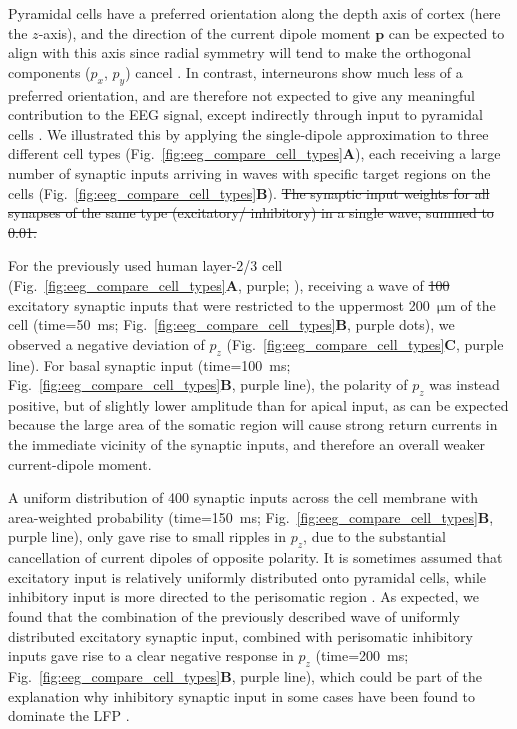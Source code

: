 \documentclass[preprint,10pt,authoryear]{elsarticle}
\newcommand{\hlg}[2][Emerald]{ {\sethlcolor{#1} \hl{#2}} }
\newcommand{\tvnnote}[1]{\color{white}{\hlg{TVN: #1 }}\color{black}}
\newcommand{\tvntxt}[1]{{\color{Emerald}#1}}
\begin{document}
Pyramidal cells have a preferred orientation along the depth axis of cortex (here the $z$-axis), and the direction of the current dipole moment $\mathbf{p}$ can be expected to align with this axis since
radial symmetry will tend to make the orthogonal components ($p_x$, $p_y$) cancel \citep{HAGEN2018}. 
In contrast, interneurons show much less of a preferred orientation, and are therefore not expected to give any meaningful contribution to the EEG signal, except indirectly through input to pyramidal cells \citep{HAGEN2016}.
We illustrated this by applying the single-dipole approximation to three different cell types (Fig.~\ref{fig:eeg_compare_cell_types}\textbf{A}), each receiving a large number of synaptic inputs arriving in waves with specific target regions on the cells (Fig.~\ref{fig:eeg_compare_cell_types}\textbf{B}). \tvntxt{\sout{The synaptic input weights for all synapses of the same type (excitatory/ inhibitory) in a single wave, summed to 0.01. }}

For the previously used human layer-2/3 cell (Fig.~\ref{fig:eeg_compare_cell_types}\textbf{A}, purple; \cite{EYAL2016}),
receiving a wave of \tvntxt{\sout{100}} excitatory synaptic inputs that were restricted to the uppermost 200~$\si{\um}$ of the cell (time=50~ms; Fig.~\ref{fig:eeg_compare_cell_types}\textbf{B}, purple dots), we observed a negative deviation of $p_z$ (Fig.~\ref{fig:eeg_compare_cell_types}\textbf{C}, purple line). For basal synaptic input (time=100~ms; Fig.~\ref{fig:eeg_compare_cell_types}\textbf{B}, purple line), the polarity of $p_z$ was instead positive, but of slightly lower amplitude than for apical input, as can be expected because the large area of the somatic region will cause strong return currents in the immediate vicinity of the synaptic inputs, and therefore an overall weaker current-dipole moment.


A uniform distribution of 400 synaptic inputs across the cell membrane with area-weighted probability (time=150~ms; Fig.~\ref{fig:eeg_compare_cell_types}\textbf{B}, purple line), only gave rise to small ripples in $p_z$, due to the substantial cancellation of current dipoles of opposite polarity. It is sometimes assumed that excitatory input is relatively uniformly distributed onto pyramidal cells, while inhibitory input is more directed to the perisomatic region \citep{Mazzoni2015, Telenczuk2019, Skaar2020, Telenczuk2020}. As expected, we found that the combination of the previously described wave of uniformly distributed excitatory synaptic input, combined with perisomatic inhibitory inputs gave rise to a clear negative response in $p_z$ (time=200~ms; Fig.~\ref{fig:eeg_compare_cell_types}\textbf{B}, purple line), which could be part of the explanation why inhibitory synaptic input in some cases have been found to dominate the LFP \citep{HAGEN2016, TELENCZUK2016}.
\end{document}
